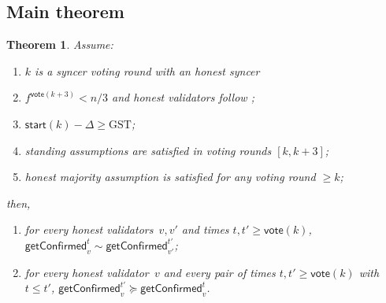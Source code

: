 \ifx\litemode\undefined\documentclass{article}\fi
\newcommand{\start}{\ensuremath{\mathsf{start}}}
\newcommand{\vote}{\ensuremath{\mathsf{vote}}}
\newcommand{\GST}{\ensuremath{\mathrm{GST}}\xspace}
\newcommand{\getConfirmed}{\textsf{getConfirmed}\xspace}
\theoremstyle{plain}
\newtheorem{theorem}{Theorem}
\theoremstyle{definition}
\theoremstyle{remark}
\begin{document}
\subsection{Main theorem}\label{sec:healing-main}

\begin{theorem}\label{thm:healing}
Assume:
\begin{enumerate}
  \item\label{thm:healing:syncer} $k$ is a syncer voting round with an honest syncer
  \item\label{thm:healing:f} $f^{\vote(k+3)} < n/3$ and honest validators follow ;
  \item\label{thm:healing:sync} $\start(k) - \Delta \geq \GST$;
  \item\label{thm:healing:standing} standing assumptions are satisfied in voting rounds $[k,k+3]$;
  \item\label{thm:healing:ohm} honest majority assumption is satisfied for any voting round $\geq k$;
\end{enumerate}
then,
\begin{enumerate}
  \item for every honest validators~$v,v'$ and times $t, t' \geq \vote(k)$, $\getConfirmed_v^{t} \sim \getConfirmed_{v'}^{t'}$;
  \item for every honest validator~$v$ and every pair of times $t, t' \geq \vote(k)$ with $t \leq t'$, $\getConfirmed_v^{t'} \succeq \getConfirmed_v^t$.
\end{enumerate}
\end{theorem}
\end{document}
